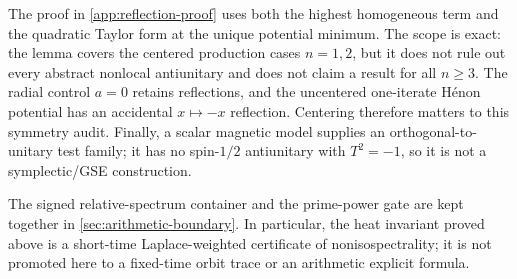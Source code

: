 The proof in \cref{app:reflection-proof} uses both the highest homogeneous
term and the quadratic Taylor form at the unique potential minimum.  The
scope is exact: the lemma covers the centered production cases \(n=1,2\),
but it does not rule out every abstract nonlocal antiunitary and does not
claim a result for all \(n\geq3\).  The radial control \(a=0\) retains
reflections, and the uncentered one-iterate H\'enon potential has an
accidental \(x\mapsto-x\) reflection.  Centering therefore matters to this
symmetry audit.  Finally, a scalar magnetic model supplies an
orthogonal-to-unitary test family; it has no spin-\(1/2\) antiunitary with
\(T^2=-1\), so it is not a symplectic/GSE construction.

The signed relative-spectrum container and the prime-power gate are kept
together in \cref{sec:arithmetic-boundary}.  In particular, the heat
invariant proved above is a short-time Laplace-weighted certificate of
nonisospectrality; it is not promoted here to a fixed-time orbit trace or an
arithmetic explicit formula.
